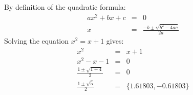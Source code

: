 By definition of the quadratic formula:
\begin{eqnarray*}
a x^2 + b x + c & = & 0 \\
x & = & \frac{-b \pm \sqrt{b^2 - 4ac}}{2a}
\end{eqnarray*}
Solving the equation $x^2 = x + 1$ gives:
\begin{eqnarray*}
	x^2 & = & x + 1 \\
	x^2 - x - 1 & = & 0 \\
	\frac{1 \pm \sqrt{1 + 4}}{2} & = & 0 \\
	\frac{1 \pm \sqrt{5}}{2} & = & \{1.61803, -0.61803 \}
\end{eqnarray*}
